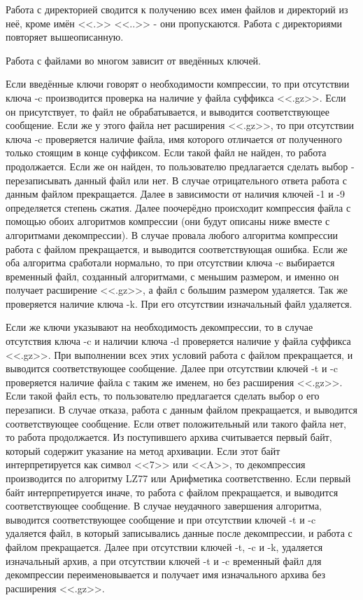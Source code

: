 \documentclass[12pt]{article}
\begin{document}
Работа с директорией сводится к получению всех имен файлов и директорий из неё, кроме имён <<.>> <<..>> - они пропускаются. Работа с директориями повторяет вышеописанную.

Работа с файлами во многом зависит от введённых ключей.

Если введённые ключи говорят о необходимости компрессии, то при отсутствии ключа -c производится проверка на наличие у файла суффикса <<.gz>>. Если он присутствует, то файл не обрабатывается, и выводится соответствующее сообщение. Если же у этого файла нет расширения <<.gz>>, то при отсутствии ключа -c проверяется наличие файла, имя которого отличается от полученного только стоящим в конце суффиксом. Если такой файл не найден, то работа продолжается. Если же он найден, то пользователю предлагается сделать выбор - перезаписывать данный файл или нет. В случае отрицательного ответа работа с данным файлом прекращается. Далее в зависимости от наличия ключей -1 и -9 определяется степень сжатия. Далее поочерёдно происходит компрессия файла с помощью обоих алгоритмов компрессии (они будут описаны ниже вместе с алгоритмами декомпрессии). В случае провала любого алгоритма компрессии работа с файлом прекращается, и выводится соответствующая ошибка. Если же оба алгоритма сработали нормально, то при отсутствии ключа -c выбирается временный файл, созданный алгоритмами, с меньшим размером, и именно он получает расширение <<.gz>>, а файл с большим размером удаляется. Так же проверяется наличие ключа -k. При его отсутствии изначальный файл удаляется.

Если же ключи указывают на необходимость декомпрессии, то в случае отсутствия ключа -c и наличии ключа -d проверяется наличие у файла суффикса <<.gz>>. При выполнении всех этих условий работа с файлом прекращается, и выводится соответствующее сообщение. Далее при отсутствии ключей -t и -c проверяется наличие файла с таким же именем, но без расширения <<.gz>>. Если такой файл есть, то пользователю предлагается сделать выбор о его перезаписи. В случае отказа, работа с данным файлом прекращается, и выводится соответствующее сообщение. Если ответ положительный или такого файла нет, то работа продолжается. Из поступившего архива считывается первый байт, который содержит указание на метод архивации. Если этот байт интерпретируется как символ <<7>> или <<A>>, %
то декомпрессия производится по алгоритму LZ77 или Арифметика соответственно. Если первый байт интерпретируется иначе, то работа с файлом прекращается, и выводится соответствующее сообщение. В случае неудачного завершения алгоритма, выводится соответствующее сообщение и при отсутствии ключей -t и -c удаляется файл, в который записывались данные после декомпрессии, и работа с файлом прекращается. Далее при отсутствии ключей -t, -c и -k, удаляется изначальный архив, а при отсутствии ключей -t и -c временный файл для декомпрессии переименовывается и получает имя изначального архива без расширения <<.gz>>.
\end{document}
